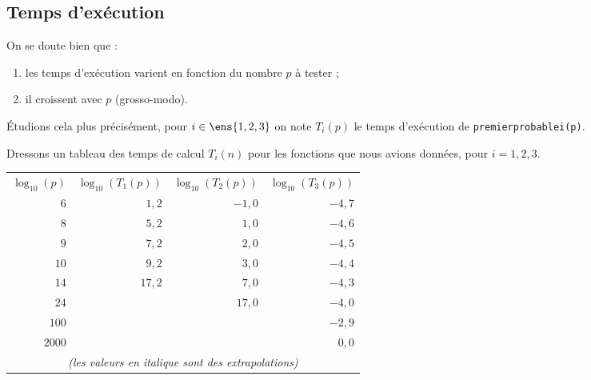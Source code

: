 \subsection{Temps d'exécution}

On se doute bien que :
\begin{enumerate}
\item les temps d'exécution varient en fonction du nombre $p$ à tester ;
\item il croissent avec $p$ (grosso-modo).
\end{enumerate}

\'Etudions cela plus précisément, pour $i \in \ens{1,2,3}$ on note $T_i(p)$ le temps d'exécution de \texttt{premierprobablei(p)}.



Dressons un tableau des temps de calcul $T_{i}(n)$ pour les fonctions
que nous avions données, pour $i=1, 2, 3$.

\begin{center}
\begin{tabular}{rrrr}
  $\log_{10}(p)$ & $\log_{10}(T_1(p))$& $\log_{10}(T_2(p))$ & $\log_{10}(T_3(p))$\\
$6$     & $1,2$         & $-1,0$        & $-4,7$\\
$8$     &$\mathit{5,2}$   & $1,0$         & $-4,6$\\
$9$     &$\mathit{7,2}$   & $\mathit{2,0}$  & $-4,5$\\
$10$    & $\mathit{9,2}$  & $\mathit{3,0}$  & $-4,4$\\
$14$    & $\mathit{17,2}$ & $\mathit{7,0}$  & $-4,3$\\
$24$    & %
                        & $\mathit{17,0}$ & $-4,0$\\
$100$ & & %
                        & $-2,9$\\
$2000$ & & & $0,0$\\
\multicolumn{4}{c}{\emph{(les valeurs en italique sont des extrapolations)}}\\
\end{tabular}
\end{center}

